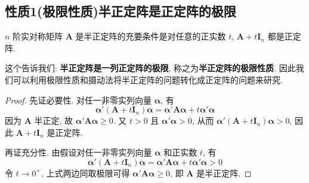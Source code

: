 \documentclass[../../main.tex]{subfiles}
\begin{document}
\subsection{性质1(极限性质)半正定阵是正定阵的极限}

\begin{proposition}\label{proposition:半正定阵关于摄动的充要条件}
\(n\) 阶实对称矩阵 \(\boldsymbol{A}\) 是半正定阵的充要条件是对任意的正实数 \(t\), \(\boldsymbol{A}+t\boldsymbol{I}_n\) 都是正定阵.
\end{proposition}
\begin{remark}
这个告诉我们: \textbf{半正定阵是一列正定阵的极限}, 称之为\textbf{半正定阵的极限性质}. 因此我们可以利用极限性质和摄动法将半正定阵的问题转化成正定阵的问题来研究.
\end{remark}
\begin{proof}
先证必要性. 对任一非零实列向量 \(\boldsymbol{\alpha}\), 有
\[\boldsymbol{\alpha}'(\boldsymbol{A}+t\boldsymbol{I}_n)\boldsymbol{\alpha}=\boldsymbol{\alpha}'\boldsymbol{A}\boldsymbol{\alpha}+t\boldsymbol{\alpha}'\boldsymbol{\alpha}\]
因为 \(\boldsymbol{A}\) 半正定, 故 \(\boldsymbol{\alpha}'\boldsymbol{A}\boldsymbol{\alpha}\geq0\). 又 \(t>0\) 且 \(\boldsymbol{\alpha}'\boldsymbol{\alpha}>0\), 从而 \(\boldsymbol{\alpha}'(\boldsymbol{A}+t\boldsymbol{I}_n)\boldsymbol{\alpha}>0\), 因此 \(\boldsymbol{A}+t\boldsymbol{I}_n\) 是正定阵.

再证充分性. 由假设对任一非零实列向量 \(\boldsymbol{\alpha}\) 和正实数 \(t\), 有
\[\boldsymbol{\alpha}'(\boldsymbol{A}+t\boldsymbol{I}_n)\boldsymbol{\alpha}=\boldsymbol{\alpha}'\boldsymbol{A}\boldsymbol{\alpha}+t\boldsymbol{\alpha}'\boldsymbol{\alpha}>0\]
令 \(t\to0^+\), 上式两边同取极限可得 \(\boldsymbol{\alpha}'\boldsymbol{A}\boldsymbol{\alpha}\geq0\), 即 \(\boldsymbol{A}\) 是半正定阵. 
\end{proof}
\end{document}

